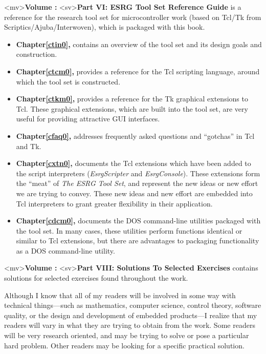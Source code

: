<mv>\textbf{Volume \vijtzeroroman{}: \vijtzerotitle{}}
<sv>\textbf{Part VI:  ESRG Tool Set Reference Guide}
is a reference for the research tool set for microcontroller 
work (based on Tcl/Tk from Scriptics/Ajuba/Interwoven), which is packaged
with this book.

\begin{itemize}
\item \textbf{Chapter\;\ref{ctin0}, \ctinzerotitle{}} contains an overview
      of the tool set and its design goals and construction.

\item \textbf{Chapter\;\ref{ctcm0}, \ctcmzerotitle{}} provides a reference
      for the Tcl scripting language, around which the tool set is constructed.

\item \textbf{Chapter\;\ref{ctkm0}, \ctkmzerotitle{}} provides a reference
      for the Tk graphical extensions to Tcl.  These graphical extensions,
	  which are built into the tool set, are very useful for providing
	  attractive GUI interfaces.

\item \textbf{Chapter\;\ref{cfaq0}, \cfaqzerotitle{}} addresses frequently
      asked questions and ``gotchas'' in Tcl and Tk.

\item \textbf{Chapter\;\ref{cxtn0}, \cxtnzerotitle{}} documents the Tcl
      extensions which have been added to the script interpreters
	  (\emph{EsrgScripter} and \emph{EsrgConsole}).  These extensions form the
	  ``meat'' of \emph{The ESRG Tool Set}, and represent the new ideas or
	  new effort we are trying to convey.  These new ideas and
      new effort are embedded into  Tcl interpreters to grant
	  greater flexibility in their application.

\item \textbf{Chapter\;\ref{cdcm0}, \cdcmzerotitle{}} documents the DOS command-line
      utilities packaged with the tool set.  In many cases, these utilities
	  perform functions identical or similar to Tcl extensions, but there are advantages to
	  packaging functionality as a DOS command-line utility.
\end{itemize}


<mv>\textbf{Volume \vsmazeroroman{}: \vsmazerotitle{}}
<sv>\textbf{Part VIII:  Solutions To Selected Exercises}
contains solutions for selected exercises
found throughout the work.

Although  I
know that all of my readers will be involved in some way
with technical things---such as mathematics, computer science,
control theory, software quality, or the design and development
of embedded products---I realize that my readers will
vary in what they are trying to obtain from the work.  Some readers
will be very research oriented, and may be trying to solve or pose
a particular hard problem.
Other readers may be looking for a specific practical
solution.

